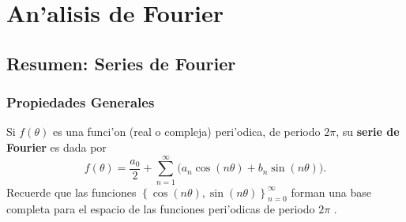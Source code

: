 \chapter{An'alisis de Fourier}
\setcounter{page}{1}


\section{Resumen: Series de Fourier}

\subsection{Propiedades Generales} Si $f(\theta)$ es una funci'on (real o compleja) peri'odica, de periodo $2\pi$, su \textbf{serie de Fourier} es dada por
\begin{equation}\label{sf1}
 f(\theta) =\frac{a_0}{2}  +\sum_{n=1}^\infty 
\big(a_n\cos(n\theta) + b_n\sin(n\theta)\big).
\end{equation}
Recuerde que las funciones $\left\lbrace\cos(n\theta),\sin(n\theta)\right\rbrace_{n=0}^{\infty}$ forman una base completa para el espacio de las funciones peri'odicas de periodo $2\pi$ \cite{Arfken}.

